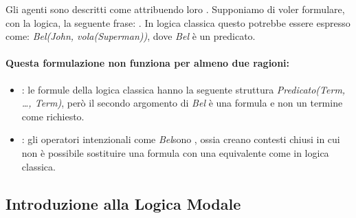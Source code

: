 Gli agenti sono descritti come  attribuendo loro . Supponiamo di voler formulare, con la logica, la seguente frase: . In logica classica questo potrebbe essere espresso come: \textit{Bel(John, vola(Superman))}, dove \textit{Bel} è un predicato. 

\paragraph{Questa formulazione non funziona per almeno due ragioni:}

\begin{itemize}
  \item {}: le formule della logica classica hanno la seguente struttura \textit{Predicato(Term, \dots, Term)}, però il secondo argomento di \textit{Bel} è una formula e non un termine come richiesto. 
\item {}: gli operatori intenzionali come \textit{Bel}sono , ossia creano contesti chiusi in cui non è possibile sostituire una formula con una equivalente come in logica classica.
\end{itemize}







\subsection{Introduzione alla Logica Modale}










